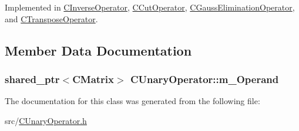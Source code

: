 Implemented in \hyperlink{classCInverseOperator_a72d6bb822dcc0d7944c9aaf53fa62b9f}{C\+Inverse\+Operator}, \hyperlink{classCCutOperator_a146755b24696c85270885bb71c29d82d}{C\+Cut\+Operator}, \hyperlink{classCGaussEliminationOperator_a040e193c6ddf7246962361db398effc2}{C\+Gauss\+Elimination\+Operator}, and \hyperlink{classCTransposeOperator_a5d1e43b7997fae8e16bb48143dedea56}{C\+Transpose\+Operator}.



\subsection{Member Data Documentation}
\subsubsection[{\texorpdfstring{m\+\_\+\+Operand}{m_Operand}}]{\setlength{\rightskip}{0pt plus 5cm}shared\+\_\+ptr$<${\bf C\+Matrix}$>$ C\+Unary\+Operator\+::m\+\_\+\+Operand\hspace{0.3cm}{\ttfamily [protected]}}\hypertarget{classCUnaryOperator_a36090d3cf3f21ebf4b9dca948aa5dcfc}{}\label{classCUnaryOperator_a36090d3cf3f21ebf4b9dca948aa5dcfc}


The documentation for this class was generated from the following file\+:\begin{DoxyCompactItemize}
\item 
src/\hyperlink{CUnaryOperator_8h}{C\+Unary\+Operator.\+h}\end{DoxyCompactItemize}

